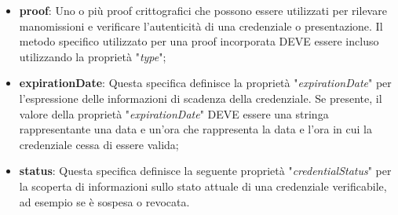 \begin{itemize}
\item \textbf{proof}: Uno o più proof crittografici che possono essere utilizzati per rilevare manomissioni e verificare l'autenticità di una credenziale o presentazione. 
Il metodo specifico utilizzato per una proof incorporata DEVE essere incluso utilizzando la proprietà "\textit{type}";

\item \textbf{expirationDate}: Questa specifica definisce la proprietà "\textit{expirationDate}" per l'espressione delle informazioni di scadenza della credenziale.
Se presente, il valore della proprietà "\textit{expirationDate}" DEVE essere una stringa rappresentante una data e un'ora che rappresenta la data e l'ora in cui la credenziale cessa 
di essere valida;

\item \textbf{status}: Questa specifica definisce la seguente proprietà "\textit{credentialStatus}" per la scoperta di informazioni sullo stato attuale di una credenziale verificabile, ad esempio 
se è sospesa o revocata.
\end{itemize}



